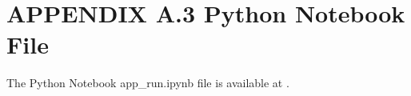 \begin{comment}
_Example of Transfer Leaning:_
1. (Dataset folder is required: https://github.com/ozanguldali/modelsWithLASSO
/blob/master/dataset)
- Unless exists, 92.16_resnet50_Adam_out.pth file must be downloaded and 
inserted into "cnn/saved_models" directory.
- Link to file:
- https://github.com/ozanguldali/modelsWithLASSO/blob/master/cnn
/saved_models/92.16_resnet50_Adam_out.pth

`app.main(transfer_learning=True, ml_model_name="all",
ml_features="all", cnn_model_name="resnet50", is_pre_trained=True,
cv=10, dataset_folder="dataset", 
pretrain_file="92.16_resnet50_Adam_out", seed=4)`

2. (Dataset folder is not needed)
- Unless exists, 92.16_resnet50_Adam_final_X_cnn_train.npy,
92.16_resnet50_Adam_final_X_cnn_test.npy, X_info_train.npy, 
X_info_test.npy, y_train.npy, and y_test.npy files must be 
downloaded and inserted into project root directory.
- Link to files: 
- https://github.com/ozanguldali/modelsWithLASSO/blob/master
/92.16_resnet50_Adam_final_X_cnn_train.npy
- https://github.com/ozanguldali/modelsWithLASSO/blob/master
/92.16_resnet50_Adam_final_X_cnn_test.npy
- https://github.com/ozanguldali/modelsWithLASSO/blob/master
/X_info_train.npy
- https://github.com/ozanguldali/modelsWithLASSO/blob/master
/X_info_test.npy
- https://github.com/ozanguldali/modelsWithLASSO/blob/master
/y_train.npy
- https://github.com/ozanguldali/modelsWithLASSO/blob/master
/y_test.npy

`app.main(transfer_learning=True, ml_model_name="all", ml_features="all", load_numpy=True, validate_cv=True, cv=10,
numpy_prefix="92.16_resnet50_Adam_final", seed=4)`

---

### Package Versions
- Python Language: 3.7.6
- Clang: 4.0.1
- pip: 20.1.1


- PyTorch: 1.5.0
- TorchSummary: 1.5.1
- TorchVision 0.6.0


- Scikit-Learn: 0.23.2


- R Language: 4.0.3
- TULIP: 1.0.1


- TensorFlow: 2.3.1
- TensorFlow-Addons: 0.11.2
- TensorFlow-Estimator: 2.3.0
- TensorFlow-Hub: 0.10.0
- TensorFlow-Probability: 0.10.0


- log4p: 2019.7.13.3
- log4python: 0.2.31


\end{verbatim}
\end{comment}



\clearpage

\section*{APPENDIX A.3 Python Notebook File}

The Python Notebook app\_run.ipynb file is available at \textcolor{blue}{}.


% 



\newpage








